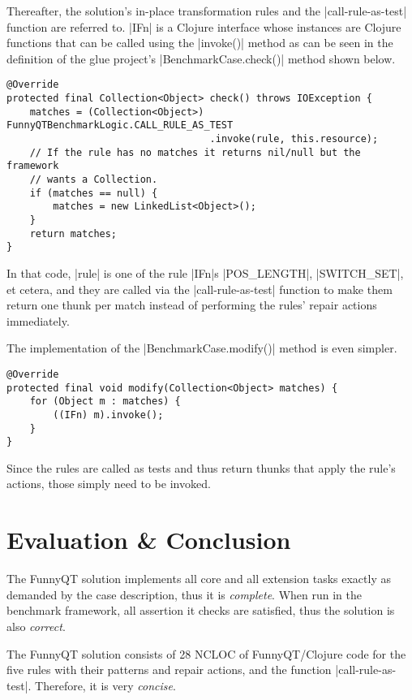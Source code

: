 \documentclass[submission]{eptcs}
\newcommand{\code}{\clojureinline}
\begin{document}
Thereafter, the solution's in-place transformation rules and the
\code|call-rule-as-test| function are referred to.  \code|IFn| is a Clojure
interface whose instances are Clojure functions that can be called using the
\code|invoke()| method as can be seen in the definition of the glue project's
\code|BenchmarkCase.check()| method shown below.

\begin{verbatim}
@Override
protected final Collection<Object> check() throws IOException {
    matches = (Collection<Object>) FunnyQTBenchmarkLogic.CALL_RULE_AS_TEST
                                   .invoke(rule, this.resource);
    // If the rule has no matches it returns nil/null but the framework
    // wants a Collection.
    if (matches == null) {
        matches = new LinkedList<Object>();
    }
    return matches;
}
\end{verbatim}

In that code, \code|rule| is one of the rule \code|IFn|s \code|POS_LENGTH|,
\code|SWITCH_SET|, et cetera, and they are called via the
\code|call-rule-as-test| function to make them return one thunk per match
instead of performing the rules' repair actions immediately.

The implementation of the \code|BenchmarkCase.modify()| method is even simpler.

\begin{verbatim}
@Override
protected final void modify(Collection<Object> matches) {
    for (Object m : matches) {
        ((IFn) m).invoke();
    }
}
\end{verbatim}

Since the rules are called as tests and thus return thunks that apply the
rule's actions, those simply need to be invoked.


\section{Evaluation \& Conclusion}
\label{sec:evaluation}

The FunnyQT solution implements all core and all extension tasks exactly as
demanded by the case description, thus it is \emph{complete}.  When run in the
benchmark framework, all assertion it checks are satisfied, thus the solution
is also \emph{correct}.

The FunnyQT solution consists of 28 NCLOC of FunnyQT/Clojure code for the five
rules with their patterns and repair actions, and the function
\code|call-rule-as-test|.  Therefore, it is very \emph{concise}.
\end{document}

